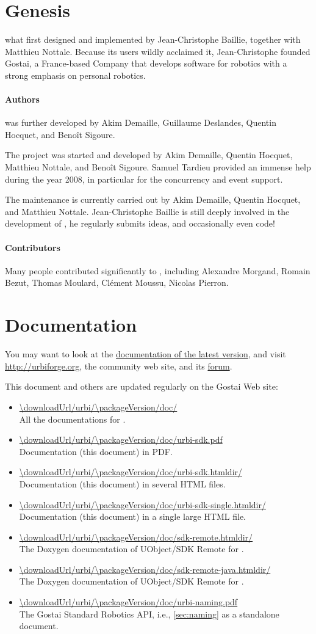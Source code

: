 \section{Genesis}

\urbi what first designed and implemented by Jean-Christophe Baillie,
together with Matthieu Nottale.  Because its users wildly acclaimed it,
Jean-Christophe founded Gostai, a France-based Company that develops
software for robotics with a strong emphasis on personal robotics.

\paragraph{Authors}
 was further developed by Akim Demaille, Guillaume Deslandes, Quentin
Hocquet, and Benoît Sigoure.

The  project was started and developed by Akim Demaille, Quentin
Hocquet, Matthieu Nottale, and Benoît Sigoure.  Samuel Tardieu provided an
immense help during the year 2008, in particular for the concurrency and
event support.

The maintenance is currently carried out by Akim Demaille, Quentin Hocquet,
and Matthieu Nottale.  Jean-Christophe Baillie is still deeply involved in
the development of \us, he regularly submits ideas, and occasionally even
code!

\paragraph{Contributors}

Many people contributed significantly to \urbi, including Alexandre Morgand,
Romain Bezut, Thomas Moulard, Clément Moussu, Nicolas Pierron.

\section{Documentation}

You may want to look at the
\href{\downloadUrl/urbi/\packageMajor.x/doc/}{documentation of the latest
  version}, and visit \url{http://urbiforge.org}, the \urbi community web
site, and its \href{http://forum.urbiforge.org}{forum}.

This document and others are updated regularly on the Gostai Web site:
\newcommand{\docItem}[2]{
  \item \url{\downloadUrl/urbi/\packageVersion/doc/#1} \\ #2.
}
\begin{itemize}
  \docItem{}
  {All the documentations for \urbi \packageVersion}
  \docItem{urbi-sdk.pdf}
  {\usdk Documentation (this document) in PDF}
  \docItem{urbi-sdk.htmldir/}
  {\usdk Documentation (this document) in several HTML files}
  \docItem{urbi-sdk-single.htmldir/}
  {\usdk Documentation (this document) in a single large HTML file}
  \docItem{sdk-remote.htmldir/}
  {The Doxygen documentation of UObject/SDK Remote for \Cxx}
  \docItem{sdk-remote-java.htmldir/}
  {The Doxygen documentation of UObject/SDK Remote for \Java}
  \docItem{urbi-naming.pdf}{The Gostai Standard Robotics API, i.e.,
  \autoref{sec:naming} as a standalone document}
\end{itemize}

